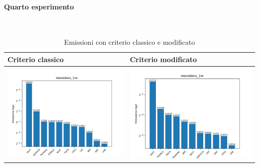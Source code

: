 \paragraph{Quarto esperimento} \textcolor{white}{.} \\
\begin{table}[H]
    \centering
    \footnotesize
    \setlength\tabcolsep{0pt}
    \begin{tabularx}{\textwidth}{|X|X|}
        \hline
        \textbf{Criterio classico} & \textbf{Criterio modificato} \\
        \hline
        \includegraphics[width=\linewidth, trim=0 0 0 0]{images/emissions_movielens_1m_30_6_earlyClassic.png} &
        \includegraphics[width=\linewidth, trim=0 0 0 0]{images/emissions_movielens_1m_30_6_earlyModified.png} \\
        \hline
    \end{tabularx}
    \caption{Emissioni con criterio classico e modificato}
    \label{tab:emissions_info}
\end{table}



